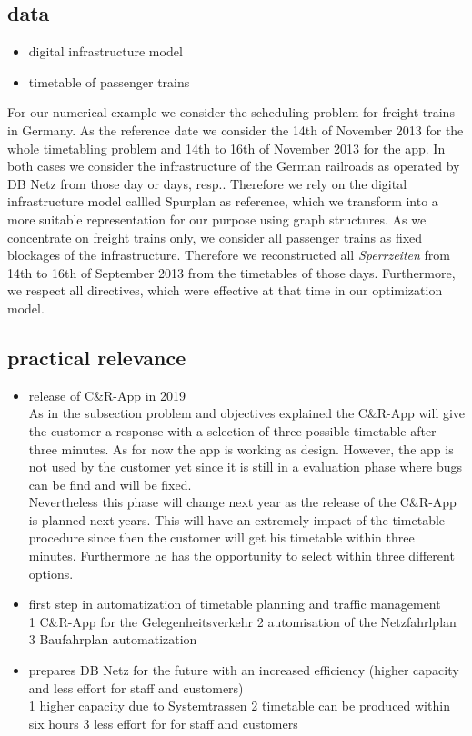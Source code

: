 \subsection{data}
\begin{itemize}
  \item digital infrastructure model
  \item timetable of passenger trains
\end{itemize}
For our numerical example we consider the scheduling problem for freight trains in Germany. As the reference date we consider the 14th of November 2013 for the whole timetabling problem and 14th to 16th of November 2013 for the app. In both cases we consider the infrastructure of the German railroads as operated by DB Netz from those day or days, resp.. Therefore we rely on the digital infrastructure model callled Spurplan as reference, which we transform into a more suitable representation for our purpose using graph structures. As we concentrate on freight trains only, we consider all passenger trains as fixed blockages of the infrastructure. Therefore we reconstructed all \textit{Sperrzeiten} from 14th to 16th of September 2013 from the timetables of those days. Furthermore, we respect all directives, which were effective at that time in our optimization model.
\subsection{practical relevance}
\begin{itemize}
  \item release of C\&R-App in 2019 \\
  As in the subsection problem and objectives explained the C\&R-App will give the customer a response with a selection of three possible 
  timetable after three minutes. As for now the app is working as design. However, the app is not used by the customer yet since it is still in a 
  evaluation phase where bugs can be find and will be fixed. \\
  Nevertheless this phase will change next year as the release of the C\&R-App is planned next years. This will have an extremely impact of the 
  timetable procedure since then the customer will get his timetable within three minutes. Furthermore he has the opportunity to select within three 
  different options. 

  \item first step in automatization of timetable planning and traffic management \\
  1 C\&R-App for the Gelegenheitsverkehr
  2 automisation of the Netzfahrlplan 
  3 Baufahrplan automatization 

  \item prepares DB Netz for the future with an increased efficiency (higher capacity and less effort for staff and customers) \\
  1 higher capacity due to Systemtrassen
  2 timetable can be produced within six hours
  3 less effort for for staff and customers
\end{itemize}
